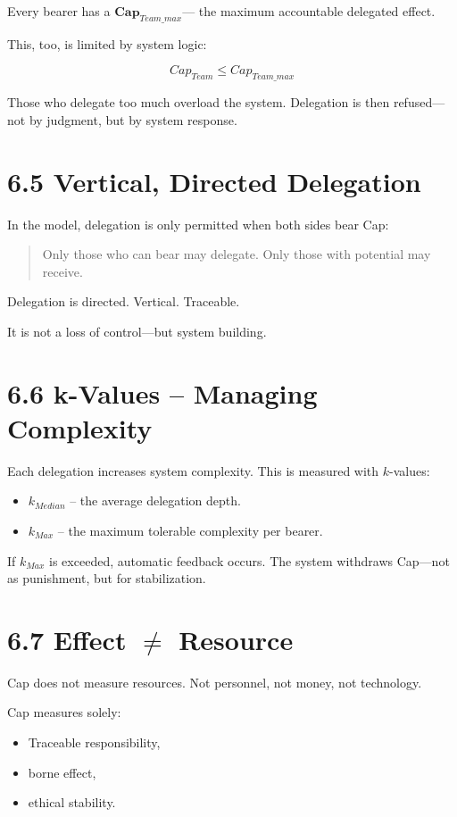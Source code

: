 \documentclass[12pt,a4paper]{book}
\begin{document}
Every bearer has a $\textbf{Cap}_{Team\_max}$—  
the maximum accountable delegated effect.

This, too, is limited by system logic:

\[
Cap_{Team} \leq Cap_{Team\_max}
\]

Those who delegate too much overload the system.  
Delegation is then refused—not by judgment, but by system response.

\section*{6.5 Vertical, Directed Delegation}

In the model, delegation is only permitted when both sides bear Cap:

\begin{quote}
Only those who can bear may delegate.  
Only those with potential may receive.
\end{quote}

Delegation is directed. Vertical. Traceable.

It is not a loss of control—but system building.

\section*{6.6 k-Values – Managing Complexity}

Each delegation increases system complexity.  
This is measured with $k$-values:

\begin{itemize}
    \item $k_{Median}$ – the average delegation depth.
    \item $k_{Max}$ – the maximum tolerable complexity per bearer.
\end{itemize}

If $k_{Max}$ is exceeded, automatic feedback occurs.  
The system withdraws Cap—not as punishment, but for stabilization.

\section*{6.7 Effect $\neq$ Resource}

Cap does not measure resources.  
Not personnel, not money, not technology.

Cap measures solely:

\begin{itemize}
    \item Traceable responsibility,
    \item borne effect,
    \item ethical stability.
\end{itemize}
\end{document}
